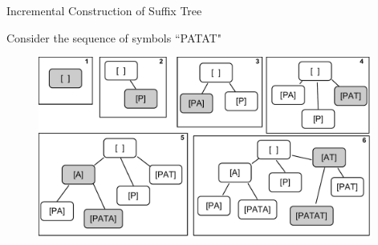 \documentclass{beamer}
\begin{document}
\begin{frame}[t]{Incremental Construction of Suffix Tree \cite{Gasthaus2010}}
	
	Consider the sequence of symbols ``PATAT"
	\begin{figure}[t]
		\begin{center}
			\includegraphics[height = 6cm]{../figs/PATAT.pdf}
		\end{center}
	\end{figure}
\end{frame}
\end{document}
